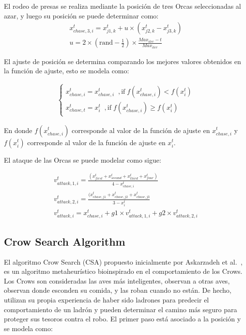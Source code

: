 \documentclass[conference]{IEEEtran}
\begin{document}
El rodeo de presas se realiza mediante la posición de tres Orcas seleccionadas al azar, y luego su posición se puede determinar como:
\begin{equation}
\begin{gathered}
x_{chase,3,i}^t =x_{j1,k}^t +u \times (x_{j2,k}^t - x_{j3,k}^t ) \\
u = 2 \times (\text{rand} - \frac{1}{2}) \times \frac{Max_{iter}-t}{Max_{iter}}
\end{gathered}
\label{eq20}
\end{equation}

El ajuste de posición se determina comparando los mejores valores obtenidos en la función de ajuste, esto se modela como:

\begin{equation}
\begin{gathered}
\begin{cases}
  x_{chase,i}^t = x_{chase,i}^t \;\;, \text{if} \; f(x_{chase,i}^t) < f(x_{i}^t ) \\
  x_{chase,t}^t = x_{i}^t  \;\;, \text{if} \;f(x_{chase,i}^t) \geq f(x_{i}^t )
\end{cases}
\end{gathered}
\label{eq21}
\end{equation}

En donde $f(x_{chase,i}^t)$ corresponde al valor de la función de ajuste en $x_{chase,i}^t$ y $f(x_{i}^t )$ corresponde al valor de la función de ajuste en $x_{i}^t$.

El ataque de las Orcas se puede modelar como sigue:

\begin{equation}
\begin{gathered}
v_{attack,1,i}^t = \frac{(x_{first}^t+x_{second}^t + x_{third}^t + x_{four}^t)}{4-x_{chase,i}^t} \\
v_{attack,2,i}^t = \frac{(x_{chase,j1}^t+x_{chase,j2}^t + x_{chase,j3}^t}{3-x_{i}^t}  \\
v_{attack,i}^t = x_{chase,i}^t+ g1 \times v_{attack,1,i}^t + g2 \times v_{attack,2,i}^t
\end{gathered}
\label{eq22}
\end{equation}

\subsection{Crow Search Algorithm}

El algoritmo Crow Search (CSA) propuesto inicialmente por Askarzadeh et al.~\cite{Askarzadeh2016}, es un algoritmo metaheurístico bioinspirado en el comportamiento de los Crows. Los Crows son consideradas las aves más inteligentes, observan a otras aves, observan donde esconden su comida, y las roban cuando no están. De hecho, utilizan su propia experiencia de haber sido ladrones para predecir el comportamiento de un ladrón y pueden determinar el camino más seguro para proteger sus tesoros contra el robo. El primer paso está asociado a la posición y se modela como:
\end{document}
